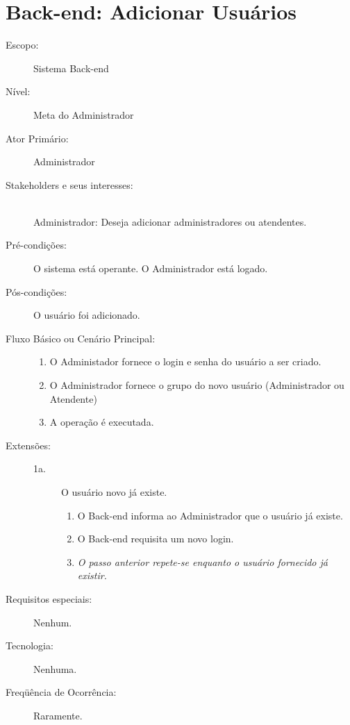 \documentclass[brazil,times]{abnt}
\begin{document}
\section{Back-end: Adicionar Usuários}
\begin{description}
\item[Escopo:] Sistema Back-end
\item[Nível:] Meta do Administrador
\item[Ator Primário:] Administrador
\item[Stakeholders e seus interesses:] \hfill \\
Administrador: Deseja adicionar administradores ou atendentes.

\item[Pré-condições:] O sistema está operante. O Administrador está logado.
\item[Pós-condições:] O usuário foi adicionado.
\item[Fluxo Básico ou Cenário Principal:]\hfill
\begin{enumerate}
  \item O Administador fornece o login e senha do usuário a ser criado.
  \item O Administrador fornece o grupo do novo usuário (Administrador ou
  Atendente)
  \item A operação é executada.
\end{enumerate}

\item[Extensões:]\hfill
\begin{description}
	\item[1a.] O usuário novo já existe.
	\begin{enumerate}
 		\item O Back-end informa ao Administrador que o usuário já existe.
 		\item O Back-end requisita um novo login.
 		\item \emph{O passo anterior repete-se enquanto o usuário fornecido já
 		existir.}
	\end{enumerate}

\end{description}
\item[Requisitos especiais:] Nenhum.
\item[Tecnologia:] Nenhuma.
\item[Freqüência de Ocorrência:] Raramente.

\end{description}
\end{document}
